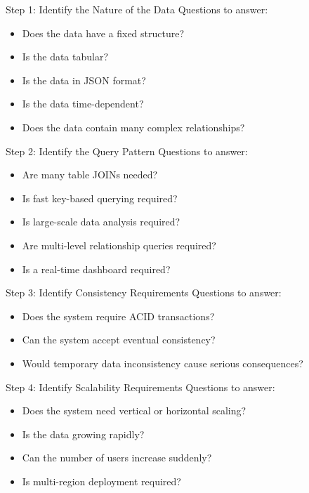 \documentclass[aspectratio=169,11pt]{beamer}
\newcommand{\smallitem}{\setlength{\itemsep}{2pt}\setlength{\parskip}{0pt}}
\begin{document}
\begin{frame}{Step 1: Identify the Nature of the Data}
Questions to answer:
\begin{itemize}
  \smallitem
  \item Does the data have a fixed structure?
  \item Is the data tabular?
  \item Is the data in JSON format?
  \item Is the data time-dependent?
  \item Does the data contain many complex relationships?
\end{itemize}
\end{frame}

\begin{frame}{Step 2: Identify the Query Pattern}
Questions to answer:
\begin{itemize}
  \smallitem
  \item Are many table JOINs needed?
  \item Is fast key-based querying required?
  \item Is large-scale data analysis required?
  \item Are multi-level relationship queries required?
  \item Is a real-time dashboard required?
\end{itemize}
\end{frame}

\begin{frame}{Step 3: Identify Consistency Requirements}
Questions to answer:
\begin{itemize}
  \smallitem
  \item Does the system require ACID transactions?
  \item Can the system accept eventual consistency?
  \item Would temporary data inconsistency cause serious consequences?
\end{itemize}
\end{frame}

\begin{frame}{Step 4: Identify Scalability Requirements}
Questions to answer:
\begin{itemize}
  \smallitem
  \item Does the system need vertical or horizontal scaling?
  \item Is the data growing rapidly?
  \item Can the number of users increase suddenly?
  \item Is multi-region deployment required?
\end{itemize}
\end{frame}
\end{document}
